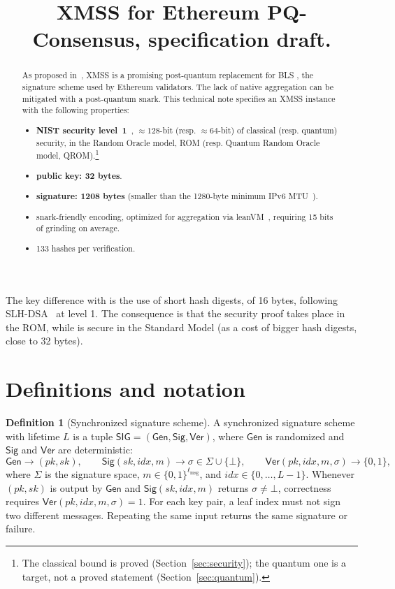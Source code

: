 \documentclass[11pt]{article}
\title{XMSS for Ethereum PQ-Consensus, specification draft.}
\author{}
\date{}
\theoremstyle{definition}
\newtheorem{definition}{Definition}[section]
\theoremstyle{plain}
\theoremstyle{remark}
\newcommand{\bits}[1]{\{0,1\}^{#1}}
\newcommand{\Gen}{\mathsf{Gen}}
\newcommand{\Sig}{\mathsf{Sig}}
\newcommand{\Ver}{\mathsf{Ver}}
\newcommand{\SIG}{\mathsf{SIG}}
\newcommand{\idx}{\mathit{idx}}
\newcommand{\sk}{\mathit{sk}}
\newcommand{\pk}{\mathit{pk}}
\newcommand{\lmsg}{\ell_{\mathrm{msg}}}
\begin{document}
\maketitle

\begin{abstract}
As proposed in~\cite{DKKW25}, XMSS is a promising post-quantum replacement for BLS \cite{BLS}, the signature scheme used by Ethereum validators. The lack of native aggregation can be mitigated with a post-quantum snark. This technical note specifies an XMSS instance with the following properties:
\begin{itemize}
  \item \textbf{NIST security level~1}~\cite{NISTPQC}, $\approx 128$-bit (resp. $\approx 64$-bit) of classical (resp. quantum) security, in the Random Oracle model, ROM (resp. Quantum Random Oracle model, QROM).\footnote{The classical bound is proved (Section~\ref{sec:security}); the quantum one is a target, not a proved statement (Section~\ref{sec:quantum}).}
  \item \textbf{public key: 32 bytes}.
  \item \textbf{signature: 1208 bytes} (smaller than the 1280-byte minimum IPv6 MTU~\cite{RFC8200}).
  \item snark-friendly encoding, optimized for aggregation via leanVM~\cite{leanVM}, requiring 15 bits of grinding on average.
  \item 133 hashes per verification.
\end{itemize}
\end{abstract}

The key difference with \cite{DKKW25} is the use of short hash digests, of 16 bytes, following SLH-DSA~\cite{FIPS205} at level 1. The consequence is that the security proof takes place in the ROM, while \cite{DKKW25} is secure in the Standard Model (as a cost of bigger hash digests, close to 32 bytes).

\section{Definitions and notation}

\begin{definition}[Synchronized signature scheme]
A synchronized signature scheme with lifetime $L$ is a tuple $\SIG=(\Gen,\Sig,\Ver)$, where $\Gen$ is randomized and $\Sig$ and $\Ver$ are deterministic:
\[
  \Gen\longrightarrow(\pk,\sk),\qquad
  \Sig(\sk,\idx,m)\longrightarrow\sigma\in\Sigma\cup\{\bot\},\qquad
  \Ver(\pk,\idx,m,\sigma)\longrightarrow\{0,1\},
\]
where $\Sigma$ is the signature space, $m\in\bits{\lmsg}$, and $\idx\in\{0,\ldots,L-1\}$. Whenever $(\pk,\sk)$ is output by $\Gen$ and $\Sig(\sk,\idx,m)$ returns $\sigma\neq\bot$, correctness requires $\Ver(\pk,\idx,m,\sigma)=1$. For each key pair, a leaf index must not sign two different messages. Repeating the same input returns the same signature or failure.
\end{definition}
\end{document}

